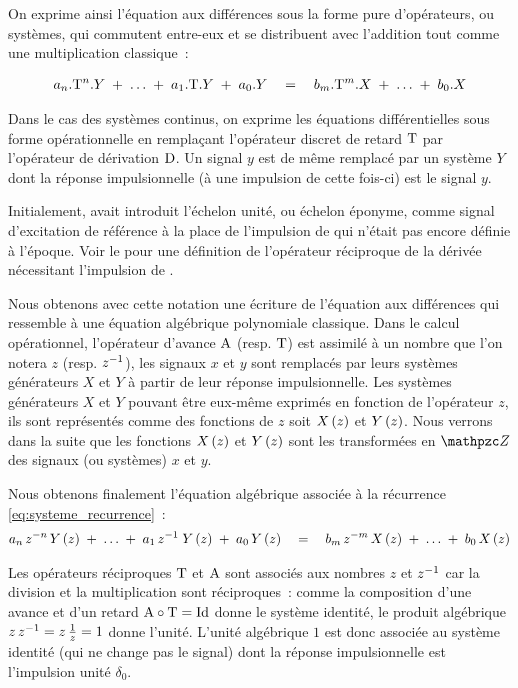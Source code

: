 On exprime ainsi l'équation aux différences sous la forme pure
d'opérateurs, ou systèmes, qui commutent entre-eux et se distribuent
avec l'addition tout comme une multiplication classique~:

\begin{eqnarray}
  a_n.\mathrm{T}^n.Y\; +\; \ldots \;+\; a_1.\mathrm{T}.Y \;+\; a_0.Y \quad  = \quad b_m.\mathrm{T}^m.X \;+\; \ldots \;+\; b_0.X
\end{eqnarray}

\begin{remarque}
  Dans le cas des systèmes continus, on exprime les équations
  différentielles sous forme opérationnelle en remplaçant l'opérateur
  discret de retard $\mathrm{T}$ par l'opérateur de dérivation $\mathrm{D}$. Un
  signal $y$ est de même remplacé par un système $Y$ dont la réponse
  impulsionnelle (à une impulsion de \Dirac{} cette fois-ci) est le
  signal $y$.

  Initialement, \Heaviside{} avait introduit l'échelon unité, ou
  échelon éponyme, comme signal d'excitation de référence à la place
  de l'impulsion de \Dirac{} qui n'était pas encore définie à
  l'époque. Voir le  pour une définition de
  l'opérateur réciproque de la dérivée nécessitant l'impulsion de
  \Dirac{}.
\end{remarque}

Nous obtenons avec cette notation une écriture de l'équation aux
différences qui ressemble à une équation algébrique polynomiale
classique. Dans le calcul opérationnel, l'opérateur d'avance
$\mathrm{A}$ (resp. $\mathrm{T}$) est assimilé à un nombre que l'on notera
$z$ (resp. $z^{-1}$), les signaux $x$ et $y$ sont remplacés par leurs
systèmes générateurs $X$ et $Y$ à partir de leur réponse
impulsionnelle. Les systèmes générateurs $X$ et $Y$ pouvant être
eux-même exprimés en fonction de l'opérateur $z$, ils sont représentés
comme des fonctions de $z$ soit $X\left(z\right)$ et $Y\left(z\right)$. Nous verrons
dans la suite que les fonctions $X\left(z\right)$ et $Y\left(z\right)$ sont les
transformées en $\TZ$ des signaux (ou systèmes) $x$ et $y$.

Nous obtenons finalement l'équation algébrique associée à la récurrence
\eqref{eq:systeme_recurrence}~:
\begin{eqnarray}
  \label{eq:systeme_algebrique}
  a_n\,z^{-n}\,Y\left(z\right)\; +\; \ldots \;+\; a_1\,z^{-1}\;Y\left(z\right) \;+\; a_0\,Y\left(z\right) \quad  = \quad b_m\,z^{-m}\,X\left(z\right) \;+\; \ldots \;+\; b_0\,X\left(z\right)
\end{eqnarray}

Les opérateurs réciproques $\mathrm{T}$ et $\mathrm{A}$ sont associés aux
nombres $z$ et $z^{-1}$ car la division et la multiplication sont
réciproques~: comme la composition d'une avance et d'un retard
$\mathrm{A} \circ \mathrm{T} = \mathrm{Id}$ donne le système identité, le produit
algébrique $z\,z^{-1}=z\,\frac{1}{z}=1$ donne l'unité. L'unité
algébrique $1$ est donc associée au \og{}système identité \fg{} (qui
ne change pas le signal) dont la réponse impulsionnelle est
l'impulsion unité $\delta_0$.

